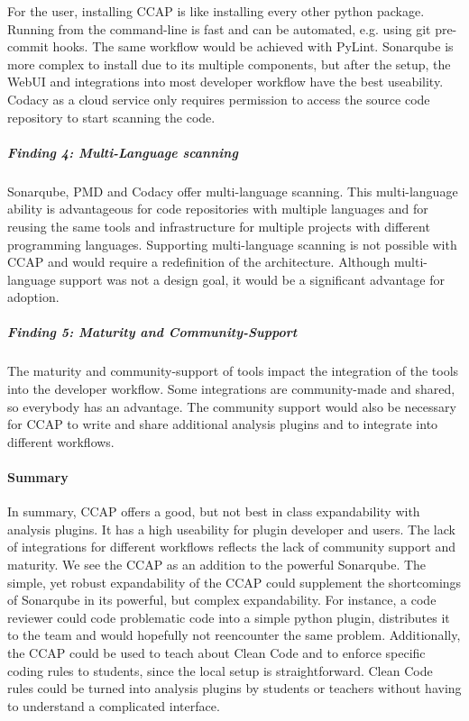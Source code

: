 For the user, installing CCAP is like installing every other python package. Running from the command-line is fast and can be automated, e.g. using git pre-commit hooks. The same workflow would be achieved with PyLint. Sonarqube is more complex to install due to its multiple components, but after the setup, the WebUI and integrations into most developer workflow have the best useability. Codacy as a cloud service only requires permission to access the source code repository to start scanning the code.

\subparagraph{Finding 4: Multi-Language scanning}
Sonarqube, PMD and Codacy offer multi-language scanning. This multi-language ability is advantageous for code repositories with multiple languages and for reusing the same tools and infrastructure for multiple projects with different programming languages. Supporting multi-language scanning is not possible with CCAP and would require a redefinition of the architecture. Although multi-language support was not a design goal, it would be a significant advantage for adoption.

\subparagraph{Finding 5: Maturity and Community-Support}
The maturity and community-support of tools impact the integration of the tools into the developer workflow. Some integrations are community-made and shared, so everybody has an advantage. The community support would also be necessary for CCAP to write and share additional analysis plugins and to integrate into different workflows.

\paragraph{Summary}
In summary, CCAP offers a good, but not best in class expandability with analysis plugins. It has a high useability for plugin developer and users. The lack of integrations for different workflows reflects the lack of community support and maturity. 
We see the CCAP as an addition to the powerful Sonarqube. The simple, yet robust expandability of the CCAP could supplement the shortcomings of Sonarqube in its powerful, but complex expandability. For instance, a code reviewer could code problematic code into a simple python plugin, distributes it to the team and would hopefully not reencounter the same problem.
Additionally, the CCAP could be used to teach about Clean Code and to enforce specific coding rules to students, since the local setup is straightforward. Clean Code rules could be turned into analysis plugins by students or teachers without having to understand a complicated interface.

